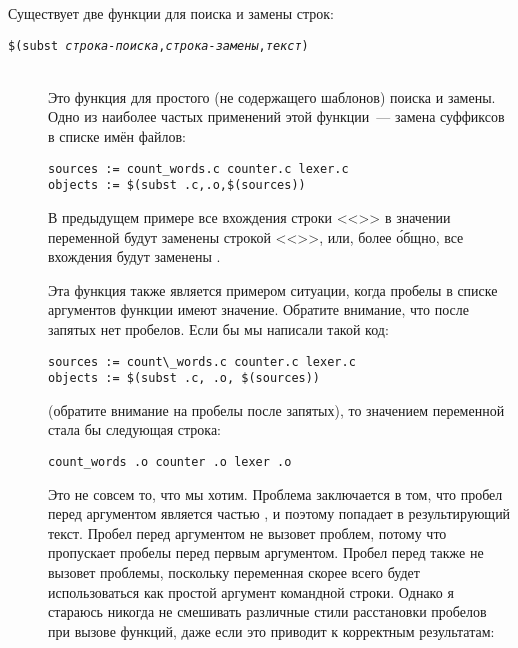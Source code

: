 Существует две функции для поиска и замены строк:

\begin{description}
\item[\texttt{\${}(subst \emph{строка-поиска},\emph{строка-замены},\emph{текст})}] \hfill \\
Это функция для простого (не содержащего шаблонов) поиска и замены.
Одно из наиболее частых применений этой функции~--- замена суффиксов в
списке имён файлов:

{\footnotesize
\begin{verbatim}
sources := count_words.c counter.c lexer.c
objects := $(subst .c,.o,$(sources))
\end{verbatim}
}

В предыдущем примере все вхождения строки <<>> в значении
переменной  будут заменены строкой
<<>>, или, более \'{о}бщно, все вхождения
 будут заменены .

Эта функция также является примером ситуации, когда пробелы в списке
аргументов функции имеют значение. Обратите внимание, что после
запятых нет пробелов. Если бы мы написали такой код:

{\footnotesize
\begin{verbatim}
sources := count\_words.c counter.c lexer.c
objects := $(subst .c, .o, $(sources))
\end{verbatim}
}

{\flushleft (обратите внимание на пробелы после запятых), то значением
переменной  стала бы следующая строка:}

{\footnotesize
\begin{verbatim}
count_words .o counter .o lexer .o
\end{verbatim}
}

Это не совсем то, что мы хотим. Проблема заключается в том, что пробел
перед аргументом  является частью
, и поэтому попадает в результирующий текст.
Пробел перед аргументом  не вызовет проблем, потому что
\GNUmake{} пропускает пробелы перед первым аргументом. Пробел перед
 также не вызовет проблемы, поскольку
переменная  скорее всего будет использоваться
как простой аргумент командной строки.  Однако я стараюсь никогда не
смешивать различные стили расстановки пробелов при вызове функций,
даже если это приводит к корректным результатам:


\end{description}
